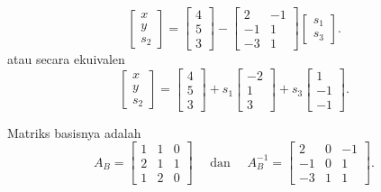 \begin{tcolorbox}[colback=algopt!6, colframe=algopt, coltitle=white, fonttitle=\bfseries, sharp corners,
    title=\textbf{Kamus Akhir dalam Notasi Matriks}]
$$
\begin{bmatrix}
x \\
y \\
s_2
\end{bmatrix}
=
\begin{bmatrix}
4 \\
5 \\
3
\end{bmatrix}
-
\begin{bmatrix}
2 & -1 \\
-1 & 1 \\
-3 & 1
\end{bmatrix}
\begin{bmatrix}
s_1 \\
s_3
\end{bmatrix}.
$$
atau secara ekuivalen
$$
\begin{bmatrix}
x \\
y \\
s_2
\end{bmatrix}
=
\begin{bmatrix}
4 \\
5 \\
3
\end{bmatrix}
+
s_1
\begin{bmatrix}
-2  \\
1  \\
3
\end{bmatrix}
 +s_3
\begin{bmatrix}
 1 \\
 -1 \\
 -1
\end{bmatrix}.$$
\end{tcolorbox}

Matriks basisnya adalah
$$
A_B = \begin{bmatrix}
1 & 1 & 0\\
2 & 1 & 1\\
1 & 2 & 0
\end{bmatrix}
\quad \text{ dan } \quad
A_B^{-1} = \begin{bmatrix}
2 & 0 & -1\\
-1 & 0 & 1\\
-3 & 1 & 1
\end{bmatrix}.
$$

